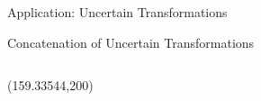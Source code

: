 \documentclass[14pt,aspectratio=169]{beamer}
\begin{document}
\begin{frame}
\begin{center}
\Large
Application: Uncertain Transformations
\end{center}
\end{frame}

\begin{frame}[fragile]{Concatenation of Uncertain Transformations}
\begin{columns}
\begin{column}{0.4\textwidth}
\makebox(159.33544,200){%
}
\end{column}
\end{columns}
\end{frame}
\end{document}
